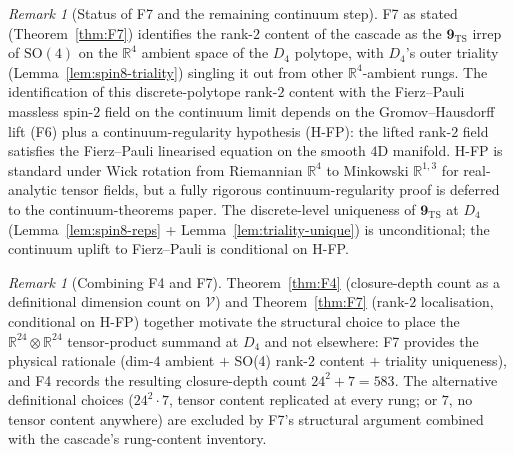 \documentclass[12pt]{article}
\theoremstyle{definition}
\theoremstyle{remark}
\newtheorem{remark}[theorem]{Remark}
\newcommand{\Vcal}{\mathcal{V}}
\begin{document}
\begin{remark}[Status of F7 and the remaining continuum step]\label{rem:F7-theorem}
F7 as stated (Theorem~\ref{thm:F7}) identifies the rank-$2$ content of the cascade as the $\mathbf{9}_{\mathrm{TS}}$ irrep of $\mathrm{SO}(4)$ on the $\mathbb{R}^4$ ambient space of the $D_4$ polytope, with $D_4$'s outer triality (Lemma~\ref{lem:spin8-triality}) singling it out from other $\mathbb{R}^4$-ambient rungs. The identification of this discrete-polytope rank-$2$ content with the Fierz--Pauli massless spin-$2$ field on the continuum limit depends on the Gromov--Hausdorff lift (F6) plus a continuum-regularity hypothesis (H-FP): the lifted rank-$2$ field satisfies the Fierz--Pauli linearised equation on the smooth $4$D manifold. H-FP is standard under Wick rotation from Riemannian $\mathbb{R}^4$ to Minkowski $\mathbb{R}^{1,3}$ for real-analytic tensor fields, but a fully rigorous continuum-regularity proof is deferred to the continuum-theorems paper. The discrete-level uniqueness of $\mathbf{9}_{\mathrm{TS}}$ at $D_4$ (Lemma~\ref{lem:spin8-reps} + Lemma~\ref{lem:triality-unique}) is unconditional; the continuum uplift to Fierz--Pauli is conditional on H-FP.
\end{remark}

\begin{remark}[Combining F4 and F7]
Theorem~\ref{thm:F4} (closure-depth count as a definitional dimension count on $\Vcal$) and Theorem~\ref{thm:F7} (rank-$2$ localisation, conditional on H-FP) together motivate the structural choice to place the $\mathbb{R}^{24} \otimes \mathbb{R}^{24}$ tensor-product summand at $D_4$ and not elsewhere: F7 provides the physical rationale (dim-$4$ ambient $+$ SO(4) rank-$2$ content $+$ triality uniqueness), and F4 records the resulting closure-depth count $24^2 + 7 = 583$. The alternative definitional choices ($24^2 \cdot 7$, tensor content replicated at every rung; or $7$, no tensor content anywhere) are excluded by F7's structural argument combined with the cascade's rung-content inventory.
\end{remark}
\end{document}
